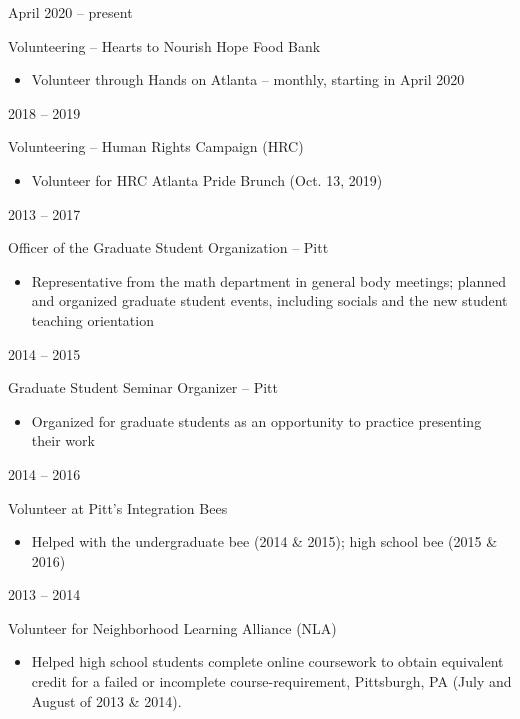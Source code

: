 \documentclass[a4paper,10pt]{article}
\newlength{\cvcolumngapwidth}
\newlength{\cvleftcolumnwidth}
\newlength{\cvrightcolumnwidth}
\newcommand{\cvtitlestyle}[1]{{\large\cvtitlefont\textcolor{cvtitlecolor}{#1}}}
\newcommand{\cvheadingstyle}[1]{{\normalsize\cvheadingfont\textcolor{cvheadingcolor}{#1}}}
\newlength{\cvafteritemskipamount}
\newlength{\cvaftertitleskipamount}
\newlength{\cvparskip}
\newcommand{\cvitem}[2]{
    \begin{minipage}[t]{\cvleftcolumnwidth}
        \raggedleft #1
    \end{minipage}%
    \hspace{\cvcolumngapwidth}%
    \begin{minipage}[t]{\cvrightcolumnwidth}
        \setlength{\parskip}{\cvparskip} #2
    \end{minipage}

    \vspace{\cvafteritemskipamount}
}
\newcommand{\cvtitle}[1]{
    \cvtitlestyle{#1}

    \vspace{\cvaftertitleskipamount}
    \vspace{-\cvparskip}
}
\begin{document}
\cvitem{
    \cvheadingstyle{April 2020 -- present}
}{
    \cvtitle{Volunteering -- Hearts to Nourish Hope Food Bank}

    \begin{itemize}[leftmargin=*]
    	\item  Volunteer through Hands on Atlanta -- monthly, starting in April 2020

    \end{itemize}

}


\cvitem{
    \cvheadingstyle{2018 -- 2019}
}{
    \cvtitle{Volunteering -- Human Rights Campaign (HRC)}

    \begin{itemize}[leftmargin=*]
    	\item Volunteer for HRC Atlanta Pride Brunch (Oct. 13, 2019)

    \end{itemize}

}




\cvitem{
    \cvheadingstyle{2013 -- 2017}
}{
    \cvtitle{Officer of the Graduate Student Organization -- Pitt}
    \begin{itemize}[leftmargin=*]
        \item Representative from the math department in general body meetings; planned and organized graduate student events, including socials and the new student teaching orientation
    \end{itemize}
    }

\cvitem{
    \cvheadingstyle{2014 -- 2015}
}{
    \cvtitle{Graduate Student Seminar Organizer -- Pitt}
    \begin{itemize}[leftmargin=*]
        \item Organized for graduate students as an opportunity to practice presenting their work
    \end{itemize}
    }



  \cvitem{
    \cvheadingstyle{2014 -- 2016}
}{
    \cvtitle{Volunteer at Pitt's Integration Bees}
    \begin{itemize}[leftmargin=*]
       	\item Helped with the undergraduate bee (2014 \& 2015); high school bee (2015 \& 2016)
    \end{itemize}  
}

  \cvitem{
    \cvheadingstyle{2013 -- 2014}
}{
    \cvtitle{Volunteer for Neighborhood Learning Alliance (NLA)}
    \begin{itemize}[leftmargin=*]
       	\item Helped high school students complete online coursework to obtain equivalent
credit for a failed or incomplete course-requirement, Pittsburgh, PA (July and August of 2013 \& 2014).
    \end{itemize}  
}
\end{document}
